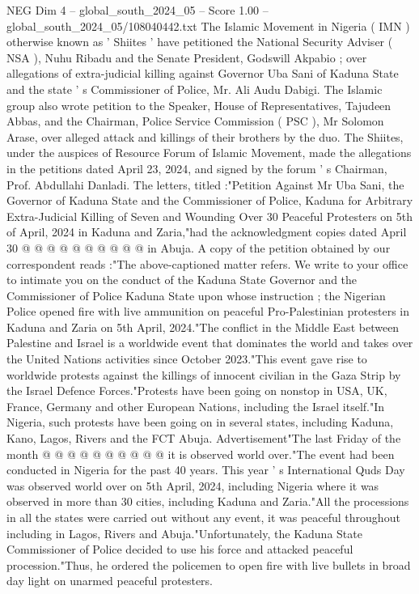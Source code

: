 \begin{textsample}{NEG Dim 4 – global\_south\_2024\_05 – Score 1.00 – global\_south\_2024\_05/108040442.txt}  \label{ex:f4_neg_255}
The Islamic Movement in Nigeria ( IMN ) otherwise known as ' Shiites ' have petitioned the National Security Adviser ( NSA ), Nuhu Ribadu and the Senate President, Godswill Akpabio ; over allegations of extra-judicial killing against Governor Uba Sani of Kaduna State and the state ' s Commissioner of Police, Mr.
Ali Audu Dabigi.
The Islamic group also wrote petition to the Speaker, House of Representatives, Tajudeen Abbas, and the Chairman, Police Service Commission ( PSC ), Mr Solomon Arase, over alleged attack and killings of their brothers by the duo.
The Shiites, under the auspices of Resource Forum of Islamic Movement, made the allegations in the petitions dated April 23, 2024, and signed by the forum ' s Chairman, Prof.
Abdullahi Danladi.
The letters, titled :"Petition Against Mr Uba Sani, the Governor of Kaduna State and the Commissioner of Police, Kaduna for Arbitrary Extra-Judicial Killing of Seven and Wounding Over 30 Peaceful Protesters on 5th of April, 2024 in Kaduna and Zaria,"had the acknowledgment copies dated April 30 @ @ @ @ @ @ @ @ @ @ in Abuja.
A copy of the petition obtained by our correspondent reads :"The above-captioned matter refers.
We write to your office to intimate you on the conduct of the Kaduna State Governor and the Commissioner of Police Kaduna State upon whose instruction ; the Nigerian Police opened fire with live ammunition on peaceful Pro-Palestinian protesters in Kaduna and Zaria on 5th April, 2024."The conflict in the Middle East between Palestine and Israel is a worldwide event that dominates the world and takes over the United Nations activities since October 2023."This event gave rise to worldwide protests against the killings of innocent civilian in the Gaza Strip by the Israel Defence Forces."Protests have been going on nonstop in USA, UK, France, Germany and other European Nations, including the Israel itself."In Nigeria, such protests have been going on in several states, including Kaduna, Kano, Lagos, Rivers and the FCT Abuja.
Advertisement"The last Friday of the month @ @ @ @ @ @ @ @ @ @ it is observed world over."The event had been conducted in Nigeria for the past 40 years.
This year ' s International Quds Day was observed world over on 5th April, 2024, including Nigeria where it was observed in more than 30 cities, including Kaduna and Zaria."All the processions in all the states were carried out without any event, it was peaceful throughout including in Lagos, Rivers and Abuja."Unfortunately, the Kaduna State Commissioner of Police decided to use his force and attacked peaceful procession."Thus, he ordered the policemen to open fire with live bullets in broad day light on unarmed peaceful protesters.

\end{textsample}
